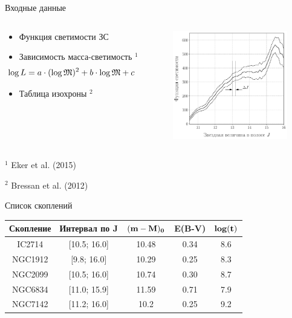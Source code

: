 \documentclass[pdf]{beamer}
\begin{document}
	\begin{frame}{Входные данные}
		\begin{columns}
			\begin{column}{0.6\textwidth}
   				\begin{itemize}
					\item Функция светимости ЗС
					\item<2-> Зависимость масса-светимость $^1$
				\begin{equation*} \hspace{-1.5cm}
				\log L=a \cdot (\log\mathfrak{M})^2+b \cdot \log\mathfrak{M}+c
				\end{equation*}
					\item<3-> Таблица изохроны $^2$
				\end{itemize}
			\end{column}
			
			\begin{column}{0.8\textwidth}
				\hspace{-0.5cm}
    			\includegraphics[width=5cm]{images/LF}
			\end{column}
		\end{columns}
		
		\vspace{1cm}
		 {\footnotesize $^1$ Eker et al. (2015)}
		
		 {\footnotesize $^2$ Bressan et al. (2012)}
	\end{frame}
	
	\begin{frame}{Список скоплений}
	\centering
		\begin{tabular}{|c|c|c|c|c|}
			\hline
				\bf{Скопление} & \bf{Интервал по J}& $\bf{(m-M)_0}$ & \bf{E(B-V)} & $\bf{log(t)}$\\
			\hline
			IC2714 & [10.5; 16.0] & 10.48 & 0.34 & 8.6\\
			NGC1912 & [9.8;  16.0] & 10.29 & 0.25 & 8.3\\
			NGC2099 & [10.5;  16.0] & 10.74 & 0.30 & 8.7\\
			NGC6834 & [11.0;  15.9] & 11.59 & 0.71 & 7.9\\
			NGC7142 & [11.2;  16.0] & 10.2 & 0.25 & 9.2\\
			\hline
		\end{tabular}
	\end{frame}
	
\end{document}
